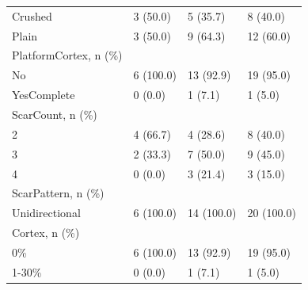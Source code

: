 \documentclass[12pt,twoside]{reedthesis}
\begin{document}
\begin{longtable}[t]{llll}
Crushed & 3 (50.0) & 5 (35.7) & 8 (40.0)\\
Plain & 3 (50.0) & 9 (64.3) & 12 (60.0)\\
PlatformCortex, n (\%) &  &  & \\
No & 6 (100.0) & 13 (92.9) & 19 (95.0)\\
\addlinespace
YesComplete & 0 (0.0) & 1 (7.1) & 1 (5.0)\\
ScarCount, n (\%) &  &  & \\
2 & 4 (66.7) & 4 (28.6) & 8 (40.0)\\
3 & 2 (33.3) & 7 (50.0) & 9 (45.0)\\
4 & 0 (0.0) & 3 (21.4) & 3 (15.0)\\
\addlinespace
ScarPattern, n (\%) &  &  & \\
Unidirectional & 6 (100.0) & 14 (100.0) & 20 (100.0)\\
Cortex, n (\%) &  &  & \\
0\% & 6 (100.0) & 13 (92.9) & 19 (95.0)\\
1-30\% & 0 (0.0) & 1 (7.1) & 1 (5.0)\\*
\end{longtable}
\endgroup{}
\end{document}

